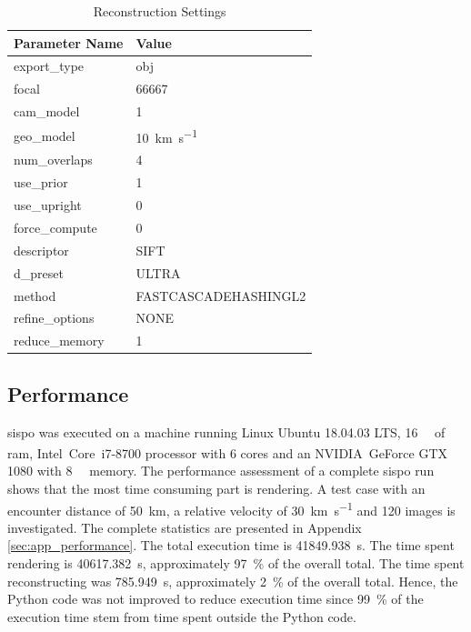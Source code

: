 \begin{table}[htpb]
    \centering
    \caption{Reconstruction Settings}
    \label{tab:comp_settings}
    \begin{tabular}{l|l}
        \textbf{Parameter Name} & \textbf{Value} \\ \hline
        export\_type       & obj   \\
        focal & 66667 \\
        cam\_model & \SI{1}{}     \\
        geo\_model & \SI{10}{\kilo\meter\per\second} \\
        num\_overlaps  & \SI{4}{} \\
        use\_prior & \SI{1}{} \\
        use\_upright & \SI{0}{} \\
        force\_compute & \SI{0}{} \\
        descriptor & SIFT \\
        d\_preset & ULTRA \\
        method & FASTCASCADEHASHINGL2 \\
        refine\_options & NONE \\
        reduce\_memory & 1
    \end{tabular}
\end{table}

\subsection{Performance}
\gls{sispo} was executed on a machine running Linux Ubuntu 18.04.03 LTS, \SI{16}{\giga\byte} of \gls{ram}, Intel\textsuperscript{\textregistered}~Core\texttrademark~i7-8700 processor with \SI{6}{} cores and an NVIDIA\textsuperscript{\textregistered}~GeForce GTX 1080 with \SI{8}{\giga\byte} memory. The performance assessment of a complete \gls{sispo} run shows that the most time consuming part is rendering. 
A test case with an encounter distance of \SI{50}{\kilo\meter}, a relative velocity of \SI{30}{\kilo\meter\per\second} and \SI{120}{} images is investigated. The complete statistics are presented in Appendix \ref{sec:app_performance}. The total execution time is \SI{41849.938}{\second}. The time spent rendering is \SI{40617.382}{\second}, approximately \SI{97}{\percent} of the overall total. The time spent reconstructing was \SI{785.949}{\second}, approximately \SI{2}{\percent} of the overall total. Hence, the Python code was not improved to reduce execution time since \SI{99}{\percent} of the execution time stem from time spent outside the Python code.